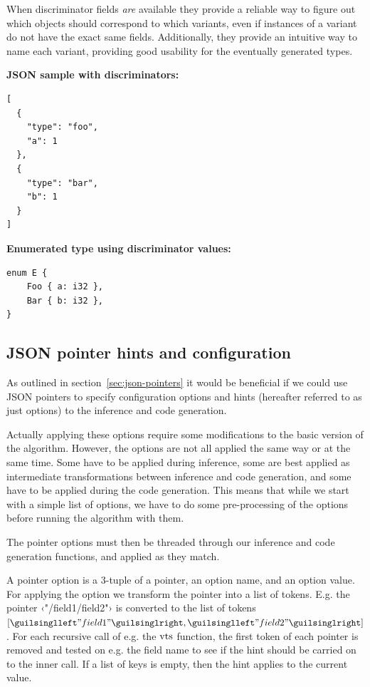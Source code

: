 When discriminator fields \emph{are} available they provide a reliable way to figure out which objects should correspond to which variants, even if instances of a variant do not have the exact same fields. Additionally, they provide an intuitive way to name each variant, providing good usability for the eventually generated types.

\begin{listing}[ht!]
\textbf{JSON sample with discriminators:}
\begin{verbatim}
[
  {
    "type": "foo",
    "a": 1
  },
  {
    "type": "bar",
    "b": 1
  }
]
\end{verbatim}
\vspace{5mm}


\textbf{Enumerated type using discriminator values:}
\begin{verbatim}
enum E {
    Foo { a: i32 },
    Bar { b: i32 },
}
\end{verbatim}
\caption{Enumerated type created from sample with discriminator field/type tags}
\label{lst:type-tags}
\end{listing}


\subsection{JSON pointer hints and configuration}
\label{sec:ext-json-pointers}

As outlined in section~\ref{sec:json-pointers} it would be beneficial if we could use JSON pointers to specify configuration options and hints (hereafter referred to as just options) to the inference and code generation.

Actually applying these options require some modifications to the basic version of the algorithm. However, the options are not all applied the same way or at the same time. Some have to be applied during inference, some are best applied as intermediate transformations between inference and code generation, and some have to be applied during the code generation. This means that while we start with a simple list of options, we have to do some pre-processing of the options before running the algorithm with them.

The pointer options must then be threaded through our inference and code generation functions, and applied as they match.

A pointer option is a 3-tuple of a pointer, an option name, and an option value. For applying the option we transform the pointer into a list of tokens. E.g. the pointer ‹"/field1/field2"› is converted to the list of tokens $[‹"field1"›, ‹"field2"›]$. For each recursive call of e.g. the $\operatorname{vts}$ function, the first token of each pointer is removed and tested on e.g. the field name to see if the hint should be carried on to the inner call. If a list of keys is empty, then the hint applies to the current value.

